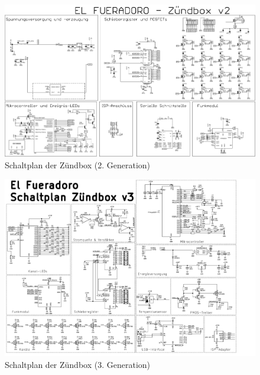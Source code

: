 \documentclass[paper=a4, parskip, numbers=noenddot, toc=listof, headsepline]{scrbook}
\begin{document}
		\begin{figure}
			\centering
			\includegraphics[angle=-90,totalheight=.95\textheight,keepaspectratio]{Bilder/Zuendboxschaltplan2}
			\caption{Schaltplan der Zündbox (2. Generation)}
			\label{fig:zuendbox2schematic}
		\end{figure}

		\begin{figure}
			\centering
			\includegraphics[angle=90,totalheight=.95\textheight,keepaspectratio]{Bilder/Zuendboxschaltplan3}
			\caption{Schaltplan der Zündbox (3. Generation)}
			\label{fig:zuendbox3schematic}
		\end{figure}
	
\end{document}
